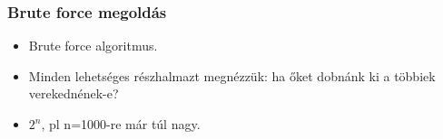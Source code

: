 \begin{frame}
\frametitle{Brute force megoldás}
\begin{itemize}
\item Brute force algoritmus.
\item Minden lehetséges részhalmazt megnézzük: ha őket dobnánk ki a többiek verekednének-e?
\item $2^n$, pl n=1000-re már túl nagy.
\end{itemize}
\end{frame}

